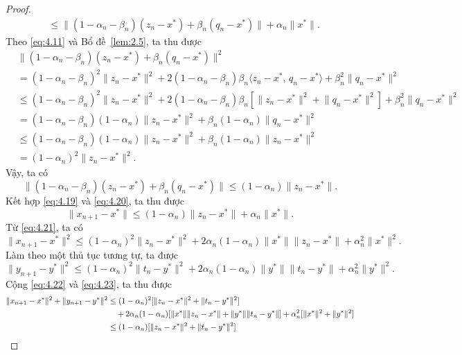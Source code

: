 \documentclass{MyBook}
\theoremstyle{plain}
\theoremstyle{definition}
\theoremstyle{remark}
\numberwithin{equation}{chapter}
\newcommand{\inp}[2]{\langle #1,\,#2\rangle}
\newcommand{\nm}[1]{\lVert #1\rVert}
\begin{document}
\begin{proof}
\begin{align}
&\le \nm{(1-\alpha_n-\beta_n)(z_n-x^{*})+\beta_n(q_n-x^{*})}+\alpha_n\nm{x^{*}}. \label{eq:4.19}
\end{align}
Theo \eqref{eq:4.11} và Bổ đề~\ref{lem:2.5}, ta thu được
\begin{align*}
&\nm{(1-\alpha_n-\beta_n)(z_n-x^{*})+\beta_n(q_n-x^{*})}^2\\
&= (1-\alpha_n-\beta_n)^2\nm{z_n-x^{*}}^2+2(1-\alpha_n-\beta_n)\beta_n\inp{z_n-x^{*}}{q_n-x^{*}}+\beta_n^2\nm{q_n-x^{*}}^2\\
&\le (1-\alpha_n-\beta_n)^2\nm{z_n-x^{*}}^2+2(1-\alpha_n-\beta_n)\beta_n[\nm{z_n-x^{*}}^2+\nm{q_n-x^{*}}^2]+\beta_n^2\nm{q_n-x^{*}}^2\\
&= (1-\alpha_n-\beta_n)(1-\alpha_n)\nm{z_n-x^{*}}^2+\beta_n(1-\alpha_n)\nm{q_n-x^{*}}^2\\
&\le (1-\alpha_n-\beta_n)(1-\alpha_n)\nm{z_n-x^{*}}^2+\beta_n(1-\alpha_n)\nm{z_n-x^{*}}^2\\
&= (1-\alpha_n)^2\nm{z_n-x^{*}}^2.
\end{align*}
Vậy, ta có
\begin{equation}
\nm{(1-\alpha_n-\beta_n)(z_n-x^{*})+\beta_n(q_n-x^{*})}\le(1-\alpha_n)\nm{z_n-x^{*}}. \label{eq:4.20}
\end{equation}
Kết hợp \eqref{eq:4.19} và \eqref{eq:4.20}, ta thu được
\begin{equation}
\nm{x_{n+1}-x^{*}}\le(1-\alpha_n)\nm{z_n-x^{*}}+\alpha_n\nm{x^{*}}. \label{eq:4.21}
\end{equation}
Từ \eqref{eq:4.21}, ta có
\begin{equation}
\nm{x_{n+1}-x^{*}}^2\le(1-\alpha_n)^2\nm{z_n-x^{*}}^2+2\alpha_n(1-\alpha_n)\nm{x^{*}}\nm{z_n-x^{*}}+\alpha_n^2\nm{x^{*}}^2. \label{eq:4.22}
\end{equation}
Làm theo một thủ tục tương tự, ta được
\begin{equation}
\nm{y_{n+1}-y^{*}}^2\le(1-\alpha_n)^2\nm{t_n-y^{*}}^2+2\alpha_n(1-\alpha_n)\nm{y^{*}}\nm{t_n-y^{*}}+\alpha_n^2\nm{y^{*}}^2. \label{eq:4.23}
\end{equation}
Cộng \eqref{eq:4.22} và \eqref{eq:4.23}, ta thu được
\begin{align}
\nm{x_{n+1}-x^{*}}^2+\nm{y_{n+1}-y^{*}}^2 &\le (1-\alpha_n)^2[\nm{z_n-x^{*}}^2+\nm{t_n-y^{*}}^2]\notag\\
&\quad +2\alpha_n(1-\alpha_n)[\nm{x^{*}}\nm{z_n-x^{*}}+\nm{y^{*}}\nm{t_n-y^{*}}]+\alpha_n^2[\nm{x^{*}}^2+\nm{y^{*}}^2]\notag\\
&\le (1-\alpha_n)[\nm{z_n-x^{*}}^2+\nm{t_n-y^{*}}^2]\notag\\

\end{align}
\end{proof}
\end{document}

